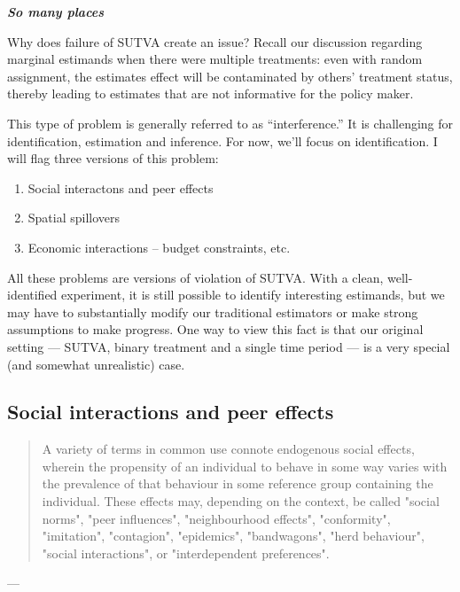 \documentclass{tufte-handout}
\theoremstyle{break}
\begin{document}
\begin{center}
    \textbf{\emph{So many places}}
\end{center}

Why does failure of SUTVA create an issue? Recall our discussion regarding marginal estimands when there were multiple treatments: even with random assignment, the estimates effect will be contaminated by others' treatment status, thereby leading to estimates that are not informative for the policy maker.

This type of problem is generally referred to as ``interference.'' It is challenging for identification, estimation and inference. For now, we'll focus on identification. I will flag three versions of this problem:        
      \begin{enumerate}
      \item Social interactons and peer effects
      \item Spatial spillovers
      \item Economic interactions -- budget constraints, etc.
      \end{enumerate}
 All these problems are versions of violation of SUTVA. With a clean, well-identified experiment, it is still possible to identify interesting estimands, but we may have to substantially modify our traditional estimators or make strong assumptions to make progress. One way to view this fact is that our original setting --- SUTVA, binary treatment and a single time period --- is a very special (and somewhat unrealistic) case.

\subsection{Social interactions and peer effects}
\begin{fullwidth}
\begin{quote}
  A variety of terms in common use connote endogenous social effects, wherein the
propensity of an individual to behave in some way varies with the prevalence of that
behaviour in some reference group containing the individual. These effects may, depending on the context, be called "social norms", "peer influences", "neighbourhood effects",
"conformity", "imitation", "contagion", "epidemics", "bandwagons", "herd behaviour",
"social interactions", or "interdependent preferences".
\end{quote}
--- \citet{manski1993identification}
\end{fullwidth}
\end{document}
